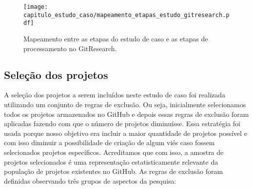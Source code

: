   \begin{figure}[H]
  \centering
  \texttt{[image: capitulo\_estudo\_caso/mapeamento\_etapas\_estudo\_gitresearch.pdf]} 
  \caption{Mapeamento entre as etapas do estudo de caso e as etapas de processamento no GitResearch. }
  \label{fig:cap_metodo_mapeamento_estudo_gitresearch} 
\end{figure}


\subsection{Seleção dos projetos}
\label{secao_cap_estudo_selecao_projetos}

A seleção dos projetos a serem incluídos neste estudo de caso foi realizada utilizando um conjunto de regras de exclusão. Ou seja, inicialmente selecionamos todos os projetos armazenados no GitHub e depois essas regras de exclusão foram aplicadas fazendo com que o número de projetos diminuísse. Essa estratégia foi usada porque nosso objetivo era incluir a maior quantidade de projetos possível e com isso diminuir a possibilidade de criação de algum viés caso fossem selecionados projetos específicos. Acreditamos que com isso, a amostra de projetos selecionados é uma representação estatisticamente relevante da população de projetos existentes no GitHub.  As regras de exclusão foram definidas observando três grupos de aspectos da pesquisa:

